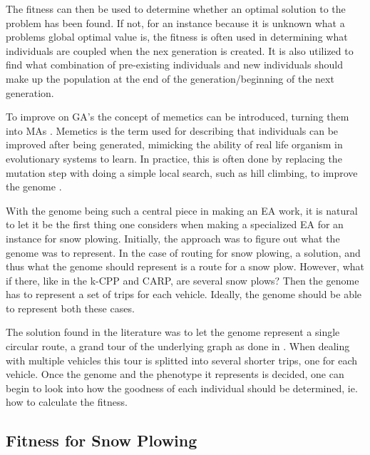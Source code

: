 The fitness can then be used to determine whether an optimal solution to the problem has been found. If not, for an instance because it is unknown what a problems global optimal value is, the fitness is often used in determining what individuals are coupled when the nex generation is created. It is also utilized to find what combination of pre-existing individuals and new individuals should make up the population at the end of the generation/beginning of the next generation.

To improve on GA's the concept of memetics can be introduced, turning them into MAs \citep{moscato1989memeticism}. Memetics is the term used for describing that individuals can be improved after being generated, mimicking the ability of real life organism in evolutionary systems to learn. In practice, this is often done by replacing the mutation step with doing a simple local search, such as hill climbing, to improve the genome \citep{lacomme2004competitiveMA}.

With the genome being such a central piece in making an EA work, it is natural to let it be the first thing one considers when making a specialized EA for an instance for snow plowing. Initially, the approach was to figure out what the genome was to represent. In the case of routing for snow plowing, a solution, and thus what the genome should represent is a route for a snow plow. However, what if there, like in the k-CPP and CARP, are several snow plows? Then the genome has to represent a set of trips for each vehicle. Ideally, the genome should be able to represent both these cases.

The solution found in the literature was to let the genome represent a single circular route, a grand tour of the underlying graph as done in \citet{lacomme2001GA}. When dealing with multiple vehicles this tour is splitted into several shorter trips, one for each vehicle. Once the genome and the phenotype it represents is decided, one can begin to look into how the goodness of each individual should be determined, ie. how to calculate the fitness.



\subsection{Fitness for Snow Plowing} %
\label{sub:fitness_for_snow_plowing}

